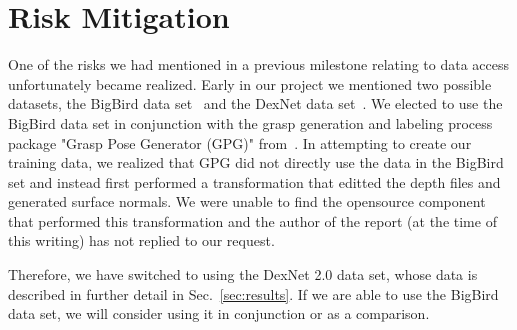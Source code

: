 \documentclass[letterpaper, 10 pt]{article}
\newcommand{\sref}[1]{Sec.~\ref{#1}} %
\begin{document}

\section{Risk Mitigation}
\label{sec:risk}
One of the risks we had mentioned in a previous milestone relating to data access unfortunately became realized. 
Early in our project we mentioned two possible datasets, the BigBird data set~\cite{singh2014bigbird} and the DexNet data set~\cite{mahler2017dex}.
We elected to use the BigBird data set in conjunction with the grasp generation and labeling process package "Grasp Pose Generator (GPG)" from~\cite{pas2017grasp}.
In attempting to create our training data, we realized that GPG did not directly use the data in the BigBird set and instead first performed a transformation that editted the depth files and generated surface normals. 
We were unable to find the opensource component that performed this transformation and the author of the report (at the time of this writing) has not replied to our request. 

Therefore, we have switched to using the DexNet 2.0 data set, whose data is described in further detail in \sref{sec:results}. 
If we are able to use the BigBird data set, we will consider using it in conjunction or as a comparison. 
\end{document}
